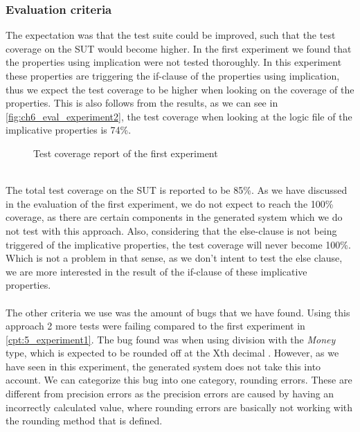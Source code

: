 \subsubsection{Evaluation criteria}
The expectation was that the test suite could be improved, such that the test coverage on the SUT would become higher. In the first experiment we found that the properties using implication were not tested thoroughly. In this experiment these properties are triggering the if-clause of the properties using implication, thus we expect the test coverage to be higher when looking on the coverage of the properties. This is also follows from the results, as we can see in \autoref{fig:ch6_eval_experiment2}, the test coverage when looking at the logic file of the implicative properties is 74\%.
\\
\begin{figure}[h!]
\caption{Test coverage report of the first experiment}
\label{fig:ch6_eval_experiment2}
\centering
\end{figure}
\\
The total test coverage on the SUT is reported to be 85\%. As we have discussed in the evaluation of the first experiment, we do not expect to reach the 100\% coverage, as there are certain components in the generated system which we do not test with this approach. Also, considering that the else-clause is not being triggered of the implicative properties, the test coverage will never become 100\%. Which is not a problem in that sense, as we don't intent to test the else clause, we are more interested in the result of the if-clause of these implicative properties.\\
\\
The other criteria we use was the amount of bugs that we have found. Using this approach 2 more tests were failing compared to the first experiment in \autoref{cpt:5_experiment1}. The bug found was when using division with the \textit{Money} type, which is expected to be rounded off at the Xth decimal . However, as we have seen in this experiment, the generated system does not take this into account. We can categorize this bug into one category, rounding errors. These are different from precision errors as the precision errors are caused by having an incorrectly calculated value, where rounding errors are basically not working with the rounding method that is defined.

